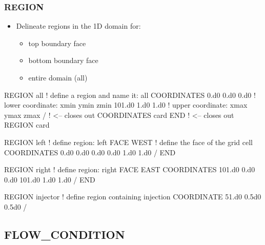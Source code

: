\documentclass{beamer}
\newcommand\bluecomment[1]{{{\color{blue} #1}}}
\newcommand\greencomment[1]{{{\color{green} #1}}}
\begin{document}
\begin{frame}\frametitle{REGION}

\begin{itemize}
  \item Delineate regions in the 1D domain for:
  \begin{itemize}
    \item top boundary face
    \item bottom boundary face
    \item entire domain (all)
  \end{itemize}
\end{itemize}

\begin{semiverbatim}
REGION all            \bluecomment{! define a region and name it: \greencomment{all}}
  COORDINATES        
    0.d0 0.d0 0.d0    \bluecomment{! lower coordinate: xmin ymin zmin}
    101.d0 1.d0 1.d0   \bluecomment{! upper coordinate: xmax ymax zmax}
  /   \bluecomment{! <-- closes out COORDINATES card}
END   \bluecomment{! <-- closes out REGION card}

\newpage
REGION left            \bluecomment{! define region:} \greencomment{left}
  FACE WEST            \bluecomment{! define the face of the grid cell}
  COORDINATES         
    0.d0 0.d0 0.d0
    0.d0 1.d0 1.d0
  /
END

REGION right         \bluecomment{! define region:} \greencomment{right}
  FACE EAST         
  COORDINATES         
    101.d0 0.d0 0.d0    
    101.d0 1.d0 1.d0
  /
END

REGION injector   \bluecomment{! define region containing injection}
  COORDINATE 51.d0 0.5d0 0.5d0
/

\end{semiverbatim}

\end{frame}

\subsection{FLOW\_CONDITION}
\end{document}
